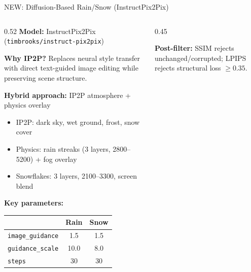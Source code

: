 \documentclass[aspectratio=169, 10pt]{beamer}
\begin{document}
\begin{frame}{NEW: Diffusion-Based Rain/Snow (InstructPix2Pix)}
\begin{columns}[T]
\begin{column}{0.52\textwidth}
\textbf{Model:} InstructPix2Pix (\texttt{timbrooks/instruct-pix2pix})

\vspace{0.3em}
\textbf{Why IP2P?} Replaces neural style transfer with direct text-guided image editing while preserving scene structure.

\vspace{0.3em}
\textbf{Hybrid approach:} IP2P atmosphere + physics overlay
\begin{itemize}
    \item IP2P: dark sky, wet ground, frost, snow cover
    \item Physics: rain streaks (3 layers, 2800--5200) + fog overlay
    \item Snowflakes: 3 layers, 2100--3300, screen blend
\end{itemize}

\vspace{0.3em}
\textbf{Key parameters:}

{\scriptsize
\begin{tabular}{lcc}
\toprule
 & \textbf{Rain} & \textbf{Snow} \\
\midrule
\texttt{image\_guidance} & 1.5 & 1.5 \\
\texttt{guidance\_scale} & 10.0 & 8.0 \\
\texttt{steps} & 30 & 30 \\
\bottomrule
\end{tabular}
}
\end{column}
\begin{column}{0.45\textwidth}
\centering
{}

\vspace{0.3em}
{\scriptsize \textbf{Post-filter:} SSIM rejects unchanged/corrupted; LPIPS rejects structural loss $\geq 0.35$.}
\end{column}
\end{columns}
\end{frame}
\end{document}
